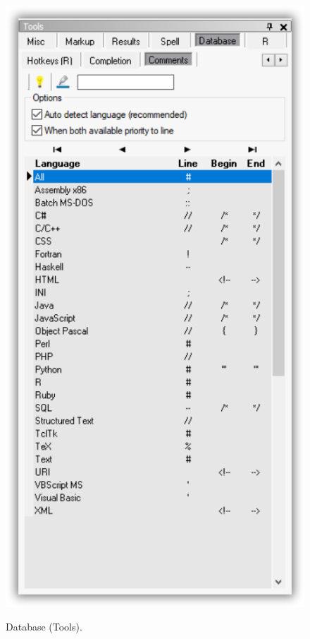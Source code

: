 \begin{figure}[H]
  \includegraphics[scale=0.35]{./res/tools_database_comments.png}\\
  \caption{Database (Tools).}
  \label{fig:tools_database}
\end{figure}

